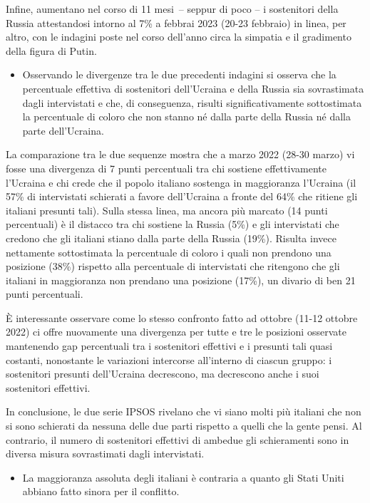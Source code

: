 \documentclass[
  openany]{book}
\providecommand{\tightlist}{%
  \setlength{\itemsep}{0pt}\setlength{\parskip}{0pt}}
\begin{document}
Infine, aumentano nel corso di 11 mesi~-- seppur di poco -- i sostenitori della Russia attestandosi intorno al 7\% a febbrai 2023 (20-23 febbraio) in linea, per altro, con le indagini poste nel corso dell'anno circa la simpatia e il gradimento della figura di Putin.

\begin{itemize}
\tightlist
\item
  Osservando le divergenze tra le due precedenti indagini si osserva che la percentuale effettiva di sostenitori dell'Ucraina e della Russia sia sovrastimata dagli intervistati e che, di conseguenza, risulti significativamente sottostimata la percentuale di coloro che non stanno né dalla parte della Russia né dalla parte dell'Ucraina.
\end{itemize}

La comparazione tra le due sequenze mostra che a marzo 2022 (28-30 marzo) vi fosse una divergenza di 7 punti percentuali tra chi sostiene effettivamente l'Ucraina e chi crede che il popolo italiano sostenga in maggioranza l'Ucraina (il 57\% di intervistati schierati a favore dell'Ucraina a fronte del 64\% che ritiene gli italiani presunti tali). Sulla stessa linea, ma ancora più marcato (14 punti percentuali) è il distacco tra chi sostiene la Russia (5\%) e gli intervistati che credono che gli italiani stiano dalla parte della Russia (19\%). Risulta invece nettamente sottostimata la percentuale di coloro i quali non prendono una posizione (38\%) rispetto alla percentuale di intervistati che ritengono che gli italiani in maggioranza non prendano una posizione (17\%), un divario di ben 21 punti percentuali.

È interessante osservare come lo stesso confronto fatto ad ottobre (11-12 ottobre 2022) ci offre nuovamente una divergenza per tutte e tre le posizioni osservate mantenendo gap percentuali tra i sostenitori effettivi e i presunti tali quasi costanti, nonostante le variazioni intercorse all'interno di ciascun gruppo: i sostenitori presunti dell'Ucraina decrescono, ma decrescono anche i suoi sostenitori effettivi.

In conclusione, le due serie IPSOS rivelano che vi siano molti più italiani che non si sono schierati da nessuna delle due parti rispetto a quelli che la gente pensi. Al contrario, il numero di sostenitori effettivi di ambedue gli schieramenti sono in diversa misura sovrastimati dagli intervistati.

\begin{itemize}
\tightlist
\item
  La maggioranza assoluta degli italiani è contraria a quanto gli Stati Uniti abbiano fatto sinora per il conflitto.
\end{itemize}
\end{document}
